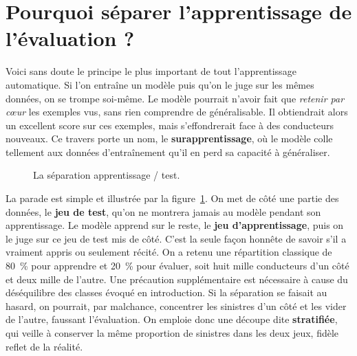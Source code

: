 \documentclass[12pt,oneside,noprintercorrection]{iut}
\begin{document}
\section{Pourquoi séparer l'apprentissage de l'évaluation ?}

Voici sans doute le principe le plus important de tout l'apprentissage automatique. Si
l'on entraîne un modèle puis qu'on le juge sur les mêmes données, on se trompe soi-même.
Le modèle pourrait n'avoir fait que \emph{retenir par cœur} les exemples vus, sans rien
comprendre de généralisable. Il obtiendrait alors un excellent score sur ces exemples,
mais s'effondrerait face à des conducteurs nouveaux. Ce travers porte un nom, le
\textbf{surapprentissage}, où le modèle colle tellement aux données d'entraînement qu'il en
perd sa capacité à généraliser.

\begin{figure}[H]
  \centering
  \caption{La séparation apprentissage / test.}
  \label{fig:split}
\end{figure}

La parade est simple et illustrée par la figure~\ref{fig:split}. On met de côté une
partie des données, le \textbf{jeu de test}, qu'on ne montrera jamais au modèle pendant
son apprentissage. Le modèle apprend sur le reste, le \textbf{jeu d'apprentissage}, puis
on le juge sur ce jeu de test mis de côté. C'est la seule façon honnête de savoir
s'il a vraiment appris ou seulement récité. On a retenu une répartition classique
de 80~\% pour apprendre et 20~\% pour évaluer, soit huit mille conducteurs d'un côté et
deux mille de l'autre.
\newline
\newline
Une précaution supplémentaire est nécessaire à cause du déséquilibre des classes évoqué
en introduction. Si la séparation se faisait au hasard, on pourrait, par malchance,
concentrer les sinistres d'un côté et les vider de l'autre, faussant l'évaluation. On
emploie donc une découpe dite \textbf{stratifiée}, qui veille à conserver la même
proportion de sinistres dans les deux jeux, fidèle reflet de la réalité.
\end{document}
